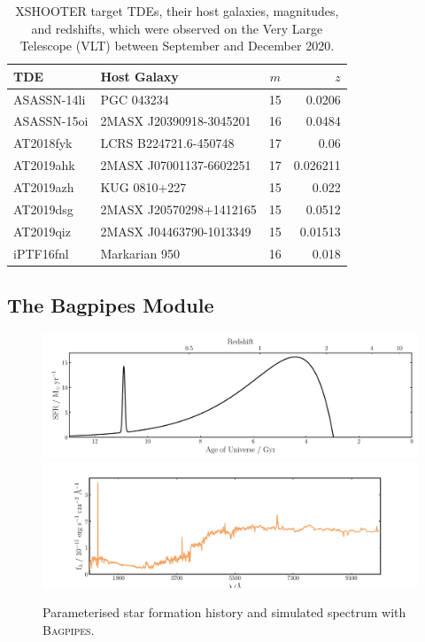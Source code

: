 \documentclass[a4paper,12pt]{article}
\begin{document}
\begin{table}[H]
  \centering
  \begin{tabular}{l l c r}
    TDE         & Host Galaxy             & $m$ & $z$      \\
    \hline \hline
    ASASSN-14li & PGC 043234              & 15  & 0.0206   \\
    ASASSN-15oi & 2MASX J20390918-3045201 & 16  & 0.0484   \\
    AT2018fyk   & LCRS B224721.6-450748   & 17  & 0.06     \\
    AT2019ahk   & 2MASX J07001137-6602251 & 17  & 0.026211 \\
    AT2019azh   & KUG 0810+227            & 15  & 0.022    \\
    AT2019dsg   & 2MASX J20570298+1412165 & 15  & 0.0512   \\
    AT2019qiz   & 2MASX J04463790-1013349 & 15  & 0.01513  \\
    iPTF16fnl   & Markarian 950           & 16  & 0.018    \\
    \hline
  \end{tabular}
  \caption{
  XSHOOTER target TDEs, their host galaxies, magnitudes, and redshifts, which
  were observed on the Very Large Telescope (VLT) between September and
  December 2020.\cite{Zwicky_1975, Jose_2014, Holoien_2016a, Arcavi_2015,
  Holoien_2016b, Wevers_2021, Cacella_2019, Holoien_2019, van_Velzen_2019,
  Perez_Torres_2019, Seibert_2019, Gezari_2016, Blagorodnova_2017}
  }
  \label{tab:xshooter_data}
\end{table}

\subsection{The Bagpipes Module}\label{sec:bagpipes_module}

\begin{figure}[H]
  \includegraphics[width=\textwidth]{alex_model_20_sfh}
  \includegraphics[width=\textwidth]{alex_model_20_spec}
  \caption{Parameterised star formation history and simulated spectrum with \textsc{Bagpipes}.}
  \label{fig:bagpipes_example_simulation}
\end{figure}
\end{document}
